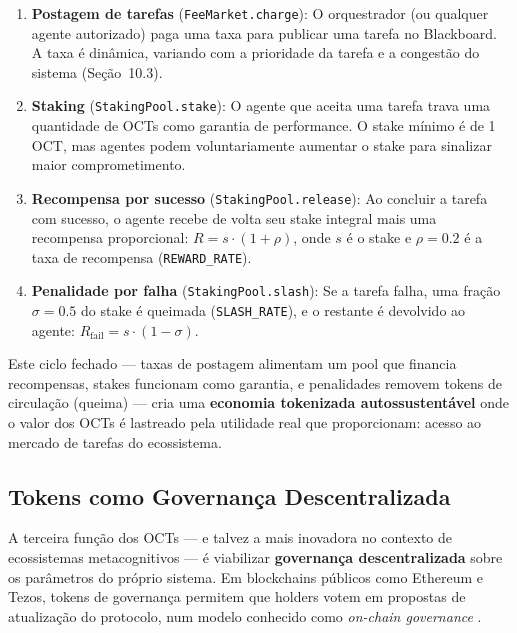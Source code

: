 \begin{enumerate}
    \item \textbf{Postagem de tarefas} (\texttt{FeeMarket.charge}): O orquestrador (ou qualquer agente autorizado) paga uma taxa para publicar uma tarefa no Blackboard. A taxa é dinâmica, variando com a prioridade da tarefa e a congestão do sistema (Seção~10.3).
    
    \item \textbf{Staking} (\texttt{StakingPool.stake}): O agente que aceita uma tarefa trava uma quantidade de OCTs como garantia de performance. O stake mínimo é de 1 OCT, mas agentes podem voluntariamente aumentar o stake para sinalizar maior comprometimento.
    
    \item \textbf{Recompensa por sucesso} (\texttt{StakingPool.release}): Ao concluir a tarefa com sucesso, o agente recebe de volta seu stake integral mais uma recompensa proporcional: $R = s \cdot (1 + \rho)$, onde $s$ é o stake e $\rho = 0.2$ é a taxa de recompensa (\texttt{REWARD\_RATE}).
    
    \item \textbf{Penalidade por falha} (\texttt{StakingPool.slash}): Se a tarefa falha, uma fração $\sigma = 0.5$ do stake é queimada (\texttt{SLASH\_RATE}), e o restante é devolvido ao agente: $R_{\text{fail}} = s \cdot (1 - \sigma)$.
\end{enumerate}

Este ciclo fechado --- taxas de postagem alimentam um pool que financia recompensas, stakes funcionam como garantia, e penalidades removem tokens de circulação (queima) --- cria uma \textbf{economia tokenizada autossustentável} onde o valor dos OCTs é lastreado pela utilidade real que proporcionam: acesso ao mercado de tarefas do ecossistema.

\subsection{Tokens como Governança Descentralizada}

A terceira função dos OCTs --- e talvez a mais inovadora no contexto de ecossistemas metacognitivos --- é viabilizar \textbf{governança descentralizada} sobre os parâmetros do próprio sistema. Em blockchains públicos como Ethereum e Tezos, tokens de governança permitem que holders votem em propostas de atualização do protocolo, num modelo conhecido como \textit{on-chain governance} \cite{buterin2014ethereum, goodman2014tezos}.

